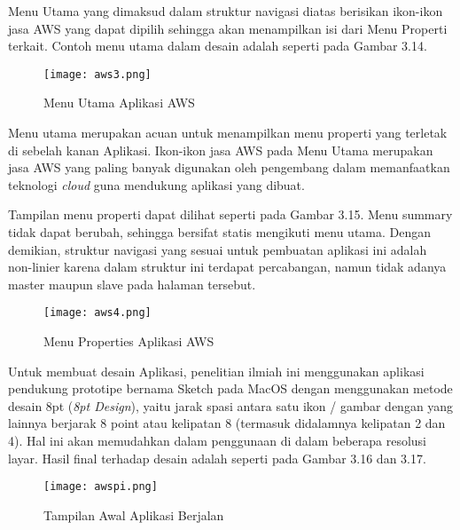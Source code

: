 \documentclass[pi.tex]{subfile}
\begin{document}
\hspace{10pt}Menu Utama yang dimaksud dalam struktur navigasi diatas berisikan ikon-ikon jasa AWS yang dapat dipilih sehingga akan menampilkan isi dari Menu Properti terkait. Contoh menu utama dalam desain adalah seperti pada Gambar 3.14.

  \begin{figure}[H]
      \centering
  \texttt{[image: aws3.png]}\\
  \caption[Menu Utama Aplikasi]{Menu Utama Aplikasi AWS}
  \end{figure}

  \hspace{10pt}Menu utama merupakan acuan untuk menampilkan menu properti yang terletak di sebelah kanan Aplikasi. Ikon-ikon jasa AWS pada Menu Utama merupakan jasa AWS yang paling banyak digunakan oleh pengembang dalam memanfaatkan teknologi \emph{cloud} guna mendukung aplikasi yang dibuat.

  \hspace{10pt}Tampilan menu properti dapat dilihat seperti pada Gambar 3.15. Menu summary tidak dapat berubah, sehingga bersifat statis mengikuti menu utama. Dengan demikian, struktur navigasi yang sesuai untuk pembuatan aplikasi ini adalah non-linier karena dalam struktur ini terdapat percabangan, namun tidak adanya master maupun slave pada halaman tersebut.

    \begin{figure}[H]
      \centering
  \texttt{[image: aws4.png]}\\
  \caption[Menu Properties Aplikasi]{Menu Properties Aplikasi AWS}
  \end{figure}

    \hspace{10pt}Untuk membuat desain Aplikasi, penelitian ilmiah ini menggunakan aplikasi pendukung prototipe bernama Sketch pada MacOS dengan menggunakan metode desain 8pt (\emph{8pt Design}), yaitu jarak spasi antara satu ikon / gambar dengan yang lainnya berjarak 8 point atau kelipatan 8 (termasuk didalamnya kelipatan 2 dan 4). Hal ini akan memudahkan dalam penggunaan di dalam beberapa resolusi layar. Hasil final terhadap desain adalah seperti pada Gambar 3.16 dan 3.17.
    \begin{figure}[H]
      \centering
  \texttt{[image: awspi.png]}\\
  \caption[Tampilan Awal Aplikasi Berjalan]{Tampilan Awal Aplikasi Berjalan}
    \end{figure}
\end{document}
